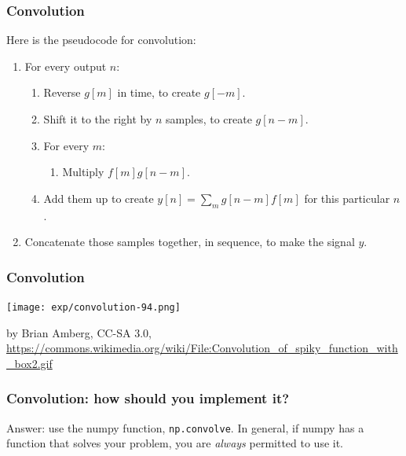 \documentclass{beamer}
\begin{document}
\begin{frame}
  \frametitle{Convolution}
  \centerline{}

  \vspace*{2mm}
  
  Here is the pseudocode for convolution:
  \begin{enumerate}
  \item For every output $n$:
    \begin{enumerate}
    \item Reverse $g[m]$ in time, to create $g[-m]$.
    \item Shift it to the right by $n$ samples, to create $g[n-m]$.
    \item For every $m$:
      \begin{enumerate}
      \item Multiply $f[m]g[n-m]$.
      \end{enumerate}
    \item Add them up to create $y[n] = \sum_m g[n-m] f[m]$ for this particular $n$.
    \end{enumerate}
    \item Concatenate those samples together, in sequence, to make the signal $y$.
  \end{enumerate}
\end{frame}

\begin{frame}
  \frametitle{Convolution}
  \centerline{\texttt{[image: exp/convolution-94.png]}}
  \begin{tiny}
    by Brian Amberg, CC-SA 3.0,
    \url{https://commons.wikimedia.org/wiki/File:Convolution_of_spiky_function_with_box2.gif}
  \end{tiny}
\end{frame}

\begin{frame}
  \frametitle{Convolution: how should you implement it?}
  Answer: use the numpy function, {\tt np.convolve}.  In general, if numpy has a function
  that solves your problem, you are {\em always} permitted to use it.

  \vspace*{2mm}
  
  \centerline{}
\end{frame}
  
\end{document}
